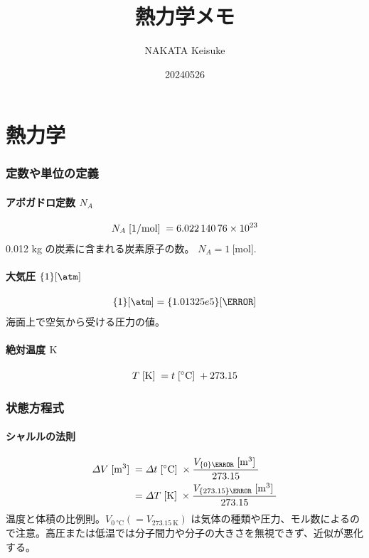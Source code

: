 \documentclass[a4paper,11pt]{jsarticle}
\newcommand{\braunit}[1]{\;\text{[}\unit[per-mode = symbol]{#1}\text{]}\;}
\begin{document}
\title{熱力学メモ}
\author{NAKATA Keisuke}
\date{20240526}
\maketitle


\part*{熱力学}

\section{定数や単位の定義}

\subsection{アボガドロ定数 \texorpdfstring{$N_A$}{N\_A}}
\begin{align*}
  N_A \braunit{\per\mol}= \num{6.02214076e23}
\end{align*}
0.012 kg の炭素に含まれる炭素原子の数。 $N_A = \qty{1}{[\mol]}$.
\cite[pp.1]{thermo}

\subsection{大気圧 \texorpdfstring{$\qty{1}{[\atm]}$}{1[atm]}}
\begin{align*}
  \qty{1}{[\atm]} = \qty{1.01325e5}{[\Pa]}
\end{align*}
海面上で空気から受ける圧力の値。
\cite[pp.1]{thermo}

\subsection{絶対温度 $\unit{\K}$}
\begin{align*}
  T \braunit{\K} = t \braunit{\celsius} + 273.15
\end{align*}
\cite[pp.10]{thermo}

\section{状態方程式}

\subsection{シャルルの法則}
\begin{align*}
  \varDelta V\braunit{\m^3}
    &= \varDelta t\braunit{\celsius}\times\frac{V_{\qty{0}{\celsius}}\braunit{\m^3}}{273.15} \\
    &= \varDelta T\braunit{\K}\times\frac{V_{\qty{273.15}{\K}}\braunit{\m^3}}{273.15}
\end{align*}
温度と体積の比例則。$V_{\qty{0}{\celsius}} (=V_{\qty{273.15}{\K}})$ は気体の種類や圧力、モル数によるので注意。高圧または低温では分子間力や分子の大きさを無視できず、近似が悪化する。
\cite[pp.10]{thermo}
\end{document}
